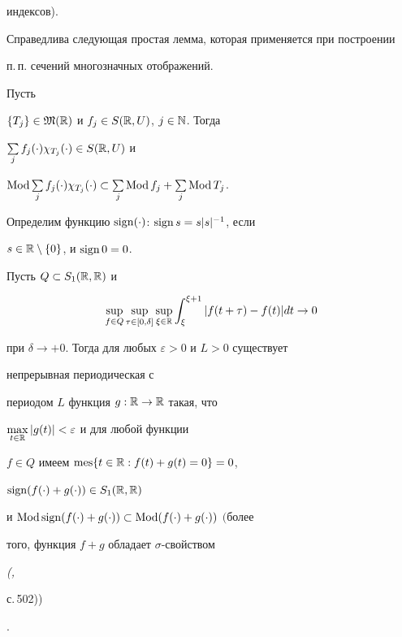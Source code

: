 индексов).





Справедлива следующая простая лемма, которая применяется при построении


п.\,п. сечений многозначных отображений.





\begin{lem} Пусть


$\{T_j\}\in\frak M(\Bbb R)$ и $f_j\in S(\Bbb R,U)$, $j\in\Bbb N$. Тогда


$\sum\limits_j f_j(\cdot)\chi_{T_j}(\cdot)\in S(\Bbb R,U)$ и


$\Mod\sum\limits_j f_j(\cdot)\chi_{T_j}(\cdot)\subset


\sum\limits_j\Mod f_j+\sum\limits_j\Mod T_j$.


\end{lem}





Определим функцию $\operatorname{sign}(\cdot)$: $\operatorname{sign} s=s|s|^{-1}$, если


$s\in\Bbb R\setminus\{0\}$, и $\operatorname{sign} 0=0$.





\begin{thm} Пусть $Q\subset S_1(\Bbb R,\Bbb R)$ и


\begin{equation}


\sup_{f\in Q}\sup_{\tau\in[0,\delta]}\sup_{\xi\in\Bbb R}


\int^{\xi+1}_\xi |f(t+\tau)-f(t)|dt\to 0


\end{equation}


при $\delta\to +0$. Тогда для любых $\varepsilon>0$ и $L>0$ существует


непрерывная периодическая с


периодом $L$ функция $g:\Bbb R\to\Bbb R$ такая, что


$\max\limits_{t\in\Bbb R}|g(t)|<\varepsilon$ и для любой функции


$f\in Q$ имеем $\operatorname{mes}\{t\in\Bbb R:f(t)+g(t)=0\}=0$,


$\operatorname{sign}(f(\cdot)+g(\cdot))\in S_1(\Bbb R,\Bbb R)$


и $\operatorname{Mod}\operatorname{sign}(f(\cdot)+g(\cdot))\subset\operatorname{Mod}(f(\cdot)+g(\cdot))$ $($более


того, функция $f+g$ обладает $\sigma$-свойством {\em (\cite{14},


с.\,502))}.


\end{thm}






